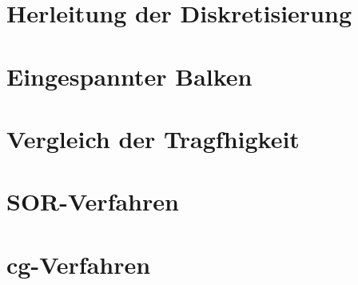 \documentclass[12pt,titlepage]{article}
\begin{document}
\section{Herleitung der Diskretisierung}

\section{Eingespannter Balken}

\section{Vergleich der Tragfhigkeit}

\section{SOR-Verfahren}

\section{cg-Verfahren}

\newpage



\begin{thebibliography}{xxxxxxxxxxxxxxxxxxxxxxxxxxxxxxxxxxxxxx}

\end{thebibliography}
\end{document}
